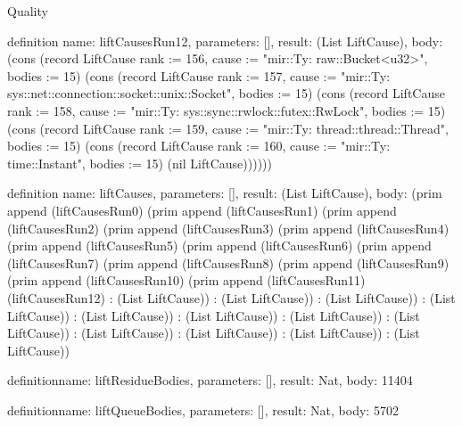 \begin{lexlean}{Quality}
\begin{semanticmodule}
definition{
  name: liftCausesRun12,
  parameters: [],
  result: (List LiftCause),
  body: (cons (record LiftCause {rank := 156, cause := "mir::Ty: raw::Bucket<u32>", bodies := 15}) (cons (record LiftCause {rank := 157, cause := "mir::Ty: sys::net::connection::socket::unix::Socket", bodies := 15}) (cons (record LiftCause {rank := 158, cause := "mir::Ty: sys::sync::rwlock::futex::RwLock", bodies := 15}) (cons (record LiftCause {rank := 159, cause := "mir::Ty: thread::thread::Thread", bodies := 15}) (cons (record LiftCause {rank := 160, cause := "mir::Ty: time::Instant", bodies := 15}) (nil LiftCause))))))
}

definition{
  name: liftCauses,
  parameters: [],
  result: (List LiftCause),
  body: (prim append (liftCausesRun0) (prim append (liftCausesRun1) (prim append (liftCausesRun2) (prim append (liftCausesRun3) (prim append (liftCausesRun4) (prim append (liftCausesRun5) (prim append (liftCausesRun6) (prim append (liftCausesRun7) (prim append (liftCausesRun8) (prim append (liftCausesRun9) (prim append (liftCausesRun10) (prim append (liftCausesRun11) (liftCausesRun12) : (List LiftCause)) : (List LiftCause)) : (List LiftCause)) : (List LiftCause)) : (List LiftCause)) : (List LiftCause)) : (List LiftCause)) : (List LiftCause)) : (List LiftCause)) : (List LiftCause)) : (List LiftCause)) : (List LiftCause))
}

definition{name: liftResidueBodies, parameters: [], result: Nat, body: 11404}

definition{name: liftQueueBodies, parameters: [], result: Nat, body: 5702}


\end{semanticmodule}
\end{lexlean}
